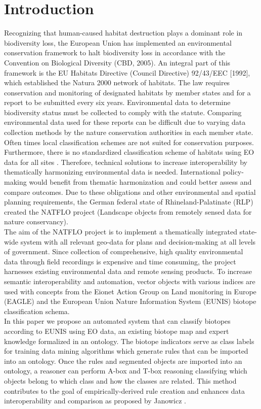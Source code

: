 \documentclass[authoryear, review,12pt,number]{elsarticle}
\begin{document}
\section{Introduction} 
Recognizing that human-caused habitat destruction plays a dominant role in
biodiversity loss, the European Union has implemented an environmental
conservation framework to halt biodiversity loss in accordance with the
Convention on Biological Diversity (CBD, 2005). An integral part of this
framework is the EU Habitats Directive (Council Directive) 92/43/EEC [1992],
which established the Natura 2000 network of habitats. The law requires
conservation and monitoring of designated habitats by member states and for a
report to be submitted every six years. Environmental data 
to determine biodiversity status must be collected to comply with the 
statute. Comparing environmental data used for these reports can be 
difficult due to varying data collection methods by the 
nature conservation authorities in each member state. Often times
local classification schemes are not suited for conservation purposes.
Furthermore, there is no standardized classification scheme of habitats using
EO data for all sites \citep{Lucas2015}. Therefore, technical solutions to
increase interoperability by thematically harmonizing environmental data is
needed. International policy-making would benefit from thematic harmonization
and could better assess and compare outcomes. Due to these obligations and 
other environmental and spatial planning requirements, the German federal state
of Rhineland-Palatinate (RLP) created the NATFLO project (Landscape objects
from remotely sensed data for nature conservancy).\\
The aim of the NATFLO project is to implement a
thematically integrated state-wide system with all relevant geo-data for plans
and decision-making at all levels of government.  Since collection of
comprehensive, high quality environmental data through field recordings is
expensive and time consuming, the project harnesses existing environmental data
and remote sensing products. To increase semantic interoperability and
automation, vector objects with various indices are used with concepts from the
Eionet Action Group on Land monitoring in Europe (EAGLE) and the European Union 
Nature Information System (EUNIS) biotope classification schema.\\
In this paper we propose an automated system that can classify
biotopes according to EUNIS using EO data, an existing biotope
map and expert knowledge formalized in an ontology. The biotope indicators
serve as class labels for training data mining algorithms which generate rules
that can be imported into an ontology. Once the rules and segmented objects are
imported into an ontology, a reasoner can perform A-box and T-box reasoning
classifying which objects belong to which class and how the classes are
related. This method contributes to the goal of empirically-derived rule
creation and enhances data interoperability and comparison as proposed by
Janowicz \citep{Janowicz2012}.
\end{document}
